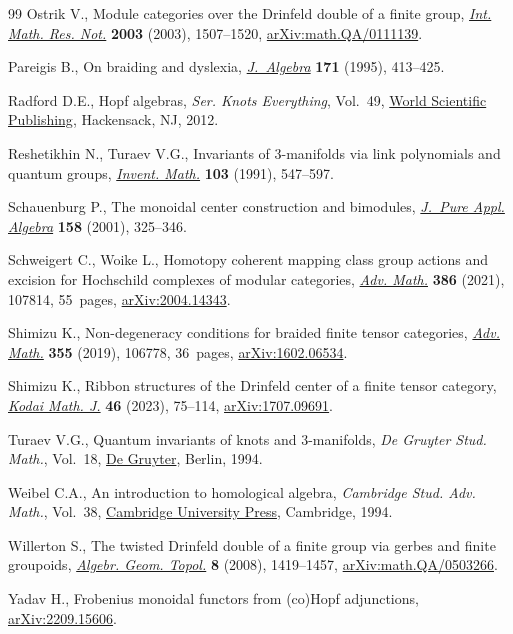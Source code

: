 \documentclass[pdftex]{sigma}
\numberwithin{equation}{section}
\begin{document}
\begin{thebibliography}{99}
Ostrik V., Module categories over the {D}rinfeld double of a finite group,
 \href{https://doi.org/10.1155/S1073792803205079}{\textit{Int. Math. Res. Not.}} \textbf{2003} (2003), 1507--1520,
 \href{https://arxiv.org/abs/math.QA/0111139}{arXiv:math.QA/0111139}.

Pareigis B., On braiding and dyslexia, \href{https://doi.org/10.1006/jabr.1995.1019}{\textit{J.~Algebra}} \textbf{171} (1995),
 413--425.

Radford D.E., Hopf algebras, \textit{Ser. Knots Everything}, Vol.~49, \href{https://doi.org/10.1142/8055}{World
 Scientific Publishing}, Hackensack, NJ, 2012.

Reshetikhin N., Turaev V.G., Invariants of {$3$}-manifolds via link polynomials
 and quantum groups, \href{https://doi.org/10.1007/BF01239527}{\textit{Invent. Math.}} \textbf{103} (1991), 547--597.

Schauenburg P., The monoidal center construction and bimodules, \href{https://doi.org/10.1016/S0022-4049(00)00040-2}{\textit{J.~Pure
 Appl. Algebra}} \textbf{158} (2001), 325--346.

Schweigert C., Woike L., Homotopy coherent mapping class group actions and
 excision for {H}ochschild complexes of modular categories, \href{https://doi.org/10.1016/j.aim.2021.107814}{\textit{Adv.
 Math.}} \textbf{386} (2021), 107814, 55~pages, \href{https://arxiv.org/abs/2004.14343}{arXiv:2004.14343}.

Shimizu K., Non-degeneracy conditions for braided finite tensor categories,
 \href{https://doi.org/10.1016/j.aim.2019.106778}{\textit{Adv. Math.}} \textbf{355} (2019), 106778, 36~pages,
 \href{https://arxiv.org/abs/1602.06534}{arXiv:1602.06534}.

Shimizu K., Ribbon structures of the {D}rinfeld center of a finite tensor
 category, \href{https://doi.org/10.2996/kmj46106}{\textit{Kodai Math. J.}} \textbf{46} (2023), 75--114,
 \href{https://arxiv.org/abs/1707.09691}{arXiv:1707.09691}.

Turaev V.G., Quantum invariants of knots and 3-manifolds, \textit{{D}e Gruyter
 Stud. Math.}, Vol.~18, \href{https://doi.org/10.1515/9783110435221}{{D}e Gruyter}, Berlin, 1994.

Weibel C.A., An introduction to homological algebra, \textit{Cambridge Stud.
 Adv. Math.}, Vol.~38, \href{https://doi.org/10.1017/CBO9781139644136}{Cambridge University Press}, Cambridge, 1994.

Willerton S., The twisted {D}rinfeld double of a finite group via gerbes and
 finite groupoids, \href{https://doi.org/10.2140/agt.2008.8.1419}{\textit{Algebr. Geom. Topol.}} \textbf{8} (2008),
 1419--1457, \href{https://arxiv.org/abs/math.QA/0503266}{arXiv:math.QA/0503266}.

Yadav H., Frobenius monoidal functors from (co){H}opf adjunctions,
 \href{https://arxiv.org/abs/2209.15606}{arXiv:2209.15606}.

\end{thebibliography}\LastPageEnding
\end{document}
